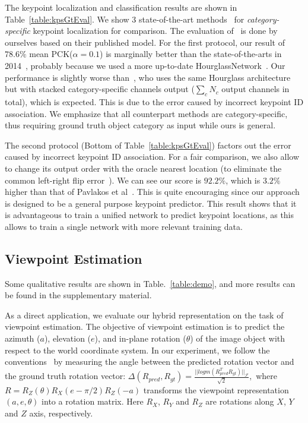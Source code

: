 \documentclass[runningheads]{llncs}
\begin{document}
The keypoint localization and classification results are shown in Table~\ref{table:kpsGtEval}.
We show 3 state-of-the-art methods~\cite{long2014convnets,tulsiani2015viewpoints,pavlakos20176} for \emph{category-specific} keypoint localization for comparison. 
The evaluation of~\cite{pavlakos20176} is done by ourselves based on their published model. 
For the first protocol, 
our result of $78.6\%$ mean PCK($\alpha = 0.1$) is marginally better than the state-of-the-arts in 2014~\cite{long2014convnets,tulsiani2015viewpoints}, probably because we used a more up-to-date HourglassNetwork~\cite{newell2016stacked}. 
Our performance is slightly worse than~\cite{pavlakos20176}, who uses the same Hourglass architecture but with stacked category-specific channels output ($\sum_{c} N_c$ output channels in total), which is expected.
This is due to the error caused by incorrect keypoint ID association. 
We emphasize that all counterpart methods are category-specific, thus requiring ground truth object category as input while ours is general. 

The second protocol (Bottom of Table~\ref{table:kpsGtEval}) factors out the error caused by incorrect keypoint ID association.
For a fair comparison, we also allow~\cite{pavlakos20176} to change its output order with the oracle nearest location (to eliminate the common left-right flip error~\cite{Ronchi_2017_ICCV}).  
We can see our score is $92.2\%$, which is $3.2\%$ higher than that of Pavlakos et al~\cite{pavlakos20176}. 
This is quite encouraging since our approach is designed to be a general purpose keypoint predictor. 
This result shows that it is advantageous to train a unified network to predict keypoint locations, as this allows to train a single network with more relevant training data.


\subsection{Viewpoint Estimation}
\label{Subsection:Viewpoint:Estimation}

Some qualitative results are shown in Table.~\ref{table:demo}, and more results can be found in the supplementary material.

As a direct application, we evaluate our hybrid representation on the task of viewpoint estimation. The objective of viewpoint estimation is to predict the azimuth ($a$), elevation ($e$), and in-plane rotation ($\theta$) of the image object with respect to the world coordinate system. In our experiment, we follow the conventions~\cite{tulsiani2015viewpoints,su2015render} by measuring the angle between the predicted rotation vector and the ground truth rotation vector:
$
\Delta(R_{pred}, R_{gt}) = \frac{||logm(R_{pred}^TR_{gt})||_{\mathcal{F}}}{\sqrt{2}},
$
where $R = R_{Z}(\theta) R_X(e - \pi / 2) R_Z(- a)$ transforms the viewpoint representation $(a, e, \theta)$ into a rotation matrix. Here $R_X$, $R_Y$ and $R_Z$ are rotations along $X$, $Y$ and $Z$ axis, respectively. 
\end{document}
